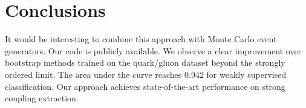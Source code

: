 \section{Conclusions}\label{sec:conclusions}

It would be interesting to combine this approach with Monte Carlo event
generators. Our code is publicly available. We observe a clear
improvement over bootstrap methods trained on the quark/gluon dataset
beyond the strongly ordered limit. The area under the curve reaches
0.942 for weakly supervised classification. Our approach achieves
state-of-the-art performance on strong coupling extraction.

